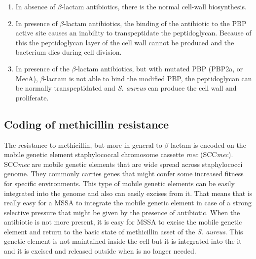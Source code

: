     \begin{multicols}{2}
        \begin{enumerate}
            \item In absence of $\beta$-lactam antibiotics, there is the normal cell-wall biosynthesis.
            \item In presence of $\beta$-lactam antibiotics, the binding of the antibiotic to the PBP active site causes an inability to transpeptidate the peptidoglycan.
                Because of this the peptidoglycan layer of the cell wall cannot be produced and the bacterium dies during cell division.
            \item In presence of the $\beta$-lactam antibiotics, but with mutated PBP (PBP$2$a, or MecA), $\beta$-lactam is not able to bind the modified PBP, the peptidoglycan can be normally transpeptidated and \emph{S. aureus} can produce the cell wall and proliferate.
        \end{enumerate}
    \end{multicols}

    \subsection{Coding of methicillin resistance}
    The resistance to methicillin, but more in general to $\beta$-lactam is encoded on the mobile genetic element staphylococcal chromosome cassette \emph{mec} (SCC\emph{mec}).
    SCC\emph{mec} are mobile genetic elements that are wide spread across staphylococci genome.
    They commonly carries genes that might confer some increased fitness for specific environments.
    This type of mobile genetic elements can be easily integrated into the genome and also can easily excises from it.
    That means that is really easy for a MSSA to integrate the mobile genetic element in case of a strong selective pressure that might be given by the presence of antibiotic.
    When the antibiotic is not more present, it is easy for MSSA to excise the mobile genetic element and return to the basic state of methicillin asset of the \emph{S. aureus}.
    This genetic element is not maintained inside the cell but it is integrated into the it and it is excised and released outside when is no longer needed.


